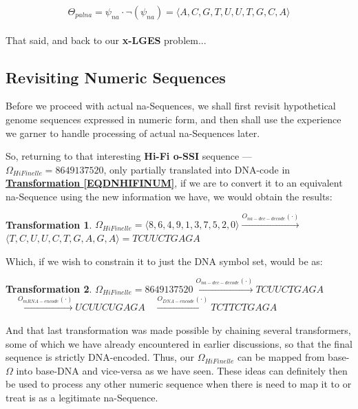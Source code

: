 \documentclass[a4paper, 18pt]{book} %
\newtheorem{trans}{Transformation}
\begin{document}
\begin{equation}
\label{EQPALNASEQ}
\Theta_{palna} = \psi_{na} \cdot \lnot(\psi_{na}) =  \langle A , C , G , T , U , U , T , G , C , A \rangle
\end{equation}\\


That said, and back to our \textbf{x-LGES} problem...

\subsection{Revisiting Numeric Sequences}

Before we proceed with actual na-Sequences, we shall first revisit hypothetical genome sequences expressed in numeric form, and then shall use the experience we garner to handle processing of actual na-Sequences later.

So, returning to that interesting \textbf{Hi-Fi o-SSI} sequence --- $\Omega_{HiFinelle} = 8649137520$, only partially translated into DNA-code in  \textbf{\hyperref[EQDNHIFINUM]{Transformation \ref{EQDNHIFINUM}}}, if we are to convert it to an equivalent na-Sequence using the new information we have, we would obtain the results:\\

\begin{trans}
\label{EQDNHIFINUMCOMPLETE}
$\Omega_{HiFinelle} = \langle 8,6,4,9,1,3,7,5,2,0 \rangle \xrightarrow{O_{na-dec-decode}(\cdot)}$\\
$  \langle T,C,U,U,C,T,G,A,G,A \rangle = TCUUCTGAGA$\\
\end{trans}


Which, if we wish to constrain it to just the DNA symbol set, would be as:\\


\begin{trans}
$\Omega_{HiFinelle} = 8649137520 \xrightarrow{O_{na-dec-decode}(\cdot)} TCUUCTGAGA$\\
$ \quad  \xrightarrow{O_{mRNA-encode}(\cdot)} UCUUCUGAGA \quad  \xrightarrow{O_{DNA-encode}(\cdot)} TCTTCTGAGA$\\
\end{trans}


And that last transformation was made possible by chaining several transformers, some of which we have already encountered in earlier discussions, so that the final sequence is strictly DNA-encoded. Thus, our $\Omega_{HiFinelle}$ can be mapped from base-$\Omega$ into base-DNA and vice-versa as we have seen. These ideas can definitely then be used to process any other numeric sequence when there is need to map it to or treat is as a legitimate na-Sequence.
\end{document}
